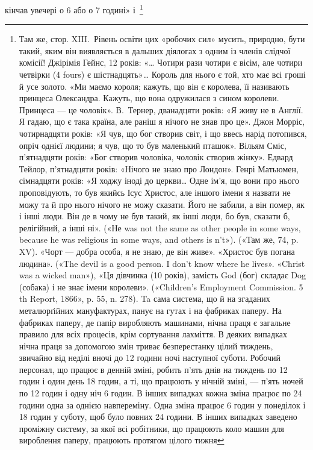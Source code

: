 кінчав увечері о 6 або о 7 годині» і~\footnote{
Там же, стор. XIII.~Рівень освіти цих «робочих сил» мусить, природно,
бути такий, яким він виявляється в дальших діялогах з одним із
членів слідчої комісії! Джірімія Гейнс, 12 років: «\dots{} Чотири рази чотири
є вісім, але чотири четвірки (4 fours) є шістнадцять»\dots{} Король для
нього є той, хто має всі гроші й усе золото. «Ми маємо короля; кажуть,
що він є королева, її називають принцеса Олександра. Кажуть, що вона
одружилася з сином королеви. Принцеса — це чоловік». В.~Тернер,
дванадцяти років: «Я живу не в Англії. Я гадаю, що є така країна, але
раніш я нічого не знав про це». Джон Морріс, чотирнадцяти років: «Я чув,
що бог створив світ, і що ввесь нарід потопився, опріч однієї людини; я
чув, що то був маленький пташок». Вільям Сміс, п’ятнадцяти років:
«Бог створив чоловіка, чоловік створив жінку». Едвард Тейлор, п’ятнадцяти
років: «Нічого не знаю про Лондон». Генрі Матьюмен, сімнадцяти
років: «Я ходжу іноді до церкви\dots{} Одне ім’я, що вони про нього проповідують,
то був якийсь Ісус Христос, але іншого імени я назвати не можу
та й про нього нічого не можу сказати. Його не забили, а він помер, як
і інші люди. Він де в чому не був такий, як інші люди, бо був, сказати б,
релігійний, а інші ні». («Не was not the same as other people in some ways,
because he was religious in some ways, and others is n’t»). («Там же, 74,
p. XV). «Чорт — добра особа, я не знаю, де він живе». «Христос був погана
людина». («The devil is a good person. I don’t know where he lives». «Christ
was a wicked man»), «Ця дівчинка (10 років), замість God (бог) складає
Dog (собака) і не знає імени королеви». («Children’s Employment Commission.
5 th Report, 1866», p. 55, n. 278). Ta сама система, що й на згаданих
металюрґійних мануфактурах, панує на гутах і на фабриках паперу.
На фабриках паперу, де папір виробляють машинами, нічна праця
є загальне правило для всіх процесів, крім сортування лахміття. В деяких
випадках нічна праця за допомогою змін триває безперестанку цілий
тиждень, звичайно від неділі вночі до 12 години ночі наступної суботи.
Робочий персонал, що працює в денній зміні, робить п’ять днів на тиждень
по 12 годин і один день 18 годин, а ті, що працюють у нічній зміні, — п’ять
ночей по 12 годин і одну ніч 6 годин. В інших випадках кожна зміна працює
по 24 години одна за однією навпереміну. Одна зміна працює 6 годин у
понеділок і 18 годин у суботу, щоб було повних 24 години. В інших випадках
заведено проміжну систему, за якої всі робітники, що працюють
коло машин для вироблення паперу, працюють протягом цілого тижня
}
